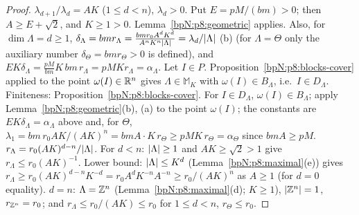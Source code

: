\begin{proof}
\label{stepN:p8:cv-params} $\lambda_{d+1}/\lambda_d=AK$ ($1\le d<n$), $\lambda_d>0$. Put $E=pM/(bm)>0$; then $A\ge E+\sqrt2$, and $K\ge1>0$. Lemma~\ref{bpN:p8:geometric} applies. Also, for $\dim\Lambda=d\ge1$, $\delta_\Lambda=bmr_\Lambda=\frac{bmr_0A^dK^d}{A^nK^n\lvert \Lambda\rvert}=\lambda_d/\lvert \Lambda\rvert$ (b) (for $\Lambda=\Theta$ only the auxiliary number $\delta_\Theta=bmr_\Theta>0$ is defined), and $EK\delta_\Lambda=\frac{pM}{bm}K\,bm\,r_\Lambda=pMKr_\Lambda=\alpha_\Lambda$.
\label{stepN:p8:cv-cover} Let $I\in P$. Proposition~\ref{bpN:p8:blocks-cover} applied to the point $\omega(I)\in\mathbb{R}^n$ gives $\Lambda\in\mathbb M_K$ with $\omega(I)\in B_\Lambda$, i.e.\ $I\in D_\Lambda$. Finiteness: Proposition~\ref{bpN:p8:blocks-cover}.
\label{stepN:p8:cv-nonres} For $I\in D_\Lambda$, $\omega(I)\in B_\Lambda$; apply Lemma~\ref{bpN:p8:geometric}(b), (a) to the point $\omega(I)$; the constants are $EK\delta_\Lambda=\alpha_\Lambda$ above and, for $\Theta$, $\lambda_1=bm\,r_0AK/(AK)^n=bmA\cdot K\,r_\Theta\ge pMK\,r_\Theta=\alpha_\Theta$ since $bmA\ge pM$.
\label{stepN:p8:cv-radii} $r_\Lambda=r_0(AK)^{d-n}/\lvert \Lambda\rvert$. For $d<n$: $\lvert \Lambda\rvert\ge1$ and $AK\ge\sqrt2>1$ give $r_\Lambda\le r_0(AK)^{-1}$. Lower bound: $\lvert \Lambda\rvert\le K^d$ (Lemma~\ref{bpN:p8:maximal}(e)) gives $r_\Lambda\ge r_0(AK)^{d-n}K^{-d}=r_0A^dK^{-n}A^{-n}\ge r_0/(AK)^n$ as $A\ge1$ (for $d=0$ equality). $d=n$: $\Lambda=\mathbb{Z}^n$ (Lemma~\ref{bpN:p8:maximal}(d); $K\ge1$), $\lvert \mathbb{Z}^n\rvert=1$, $r_{\mathbb{Z}^n}=r_0$; and $r_\Lambda\le r_0/(AK)\le r_0$ for $1\le d<n$, $r_\Theta\le r_0$.
\end{proof}

